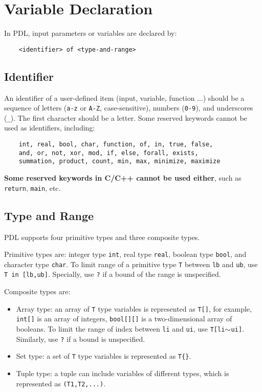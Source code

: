 \documentclass{report}
\begin{document}
\section{Variable Declaration}

In PDL, input parameters or variables are declared by:

\begin{lstlisting}
    <identifier> of <type-and-range>
\end{lstlisting}

\subsection{Identifier}

An identifier of a user-defined item (input, variable, function ...) should be a sequence of letters (\texttt{a-z} or \texttt{A-Z}, case-sensitive), numbers (\texttt{0-9}), and underscores (\texttt{\_}). The first character should be a letter. Some reserved keywords cannot be used as identifiers, including:
\begin{verbatim}
    int, real, bool, char, function, of, in, true, false,
    and, or, not, xor, mod, if, else, forall, exists, 
    summation, product, count, min, max, minimize, maximize
\end{verbatim}
\textbf{Some reserved keywords in C/C++ cannot be used either}, such as \texttt{return}, \texttt{main}, etc.

\subsection{Type and Range}

PDL supports four primitive types and three composite types.

Primitive types are: integer type \texttt{int}, real type \texttt{real}, boolean type \texttt{bool}, and character type \texttt{char}. To limit range of a primitive type \texttt{T} between \texttt{lb} and \texttt{ub}, use \texttt{T in [lb,ub]}. Specially, use \texttt{?} if a bound of the range is unspecified.

Composite types are:
\begin{itemize}
    \item Array type: an array of \texttt{T} type variables is represented as \texttt{T[]}, for example, \texttt{int[]} is an array of integers, \texttt{bool[][]} is a two-dimensional array of booleans. To limit the range of index between \texttt{li} and \texttt{ui}, use \texttt{T[li$\scriptsize{\sim}$ui]}. Similarly, use \texttt{?} if a bound is unspecified.
    \item Set type: a set of \texttt{T} type variables is represented as \texttt{T\{\}}.
    \item Tuple type: a tuple can include variables of different types, which is represented as \texttt{(T1,T2,...)}.
\end{itemize}
\end{document}
